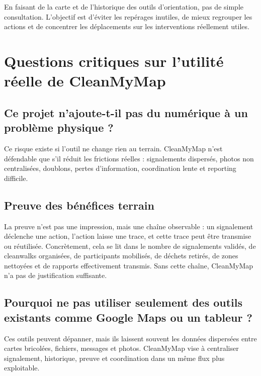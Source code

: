 \documentclass[
  10pt,
  a4paper,
  DIV=11,
  numbers=noendperiod,
  oneside]{scrreprt}
\begin{document}
En faisant de la carte et de l'historique des outils d'orientation, pas
de simple consultation. L'objectif est d'éviter les repérages inutiles,
de mieux regrouper les actions et de concentrer les déplacements sur les
interventions réellement utiles.

\section{Questions critiques sur l'utilité réelle de
CleanMyMap}\label{questions-critiques-sur-lutilituxe9-ruxe9elle-de-cleanmymap}

\subsection{Ce projet n'ajoute-t-il pas du numérique à un problème
physique
?}\label{ce-projet-najoute-t-il-pas-du-numuxe9rique-uxe0-un-probluxe8me-physique}

Ce risque existe si l'outil ne change rien au terrain. CleanMyMap n'est
défendable que s'il réduit les frictions réelles : signalements
dispersés, photos non centralisées, doublons, pertes d'information,
coordination lente et reporting difficile.

\subsection{Preuve des bénéfices
terrain}\label{preuve-des-buxe9nuxe9fices-terrain}

La preuve n'est pas une impression, mais une chaîne observable : un
signalement déclenche une action, l'action laisse une trace, et cette
trace peut être transmise ou réutilisée. Concrètement, cela se lit dans
le nombre de signalements validés, de cleanwalks organisées, de
participants mobilisés, de déchets retirés, de zones nettoyées et de
rapports effectivement transmis. Sans cette chaîne, CleanMyMap n'a pas
de justification suffisante.

\subsection{Pourquoi ne pas utiliser seulement des outils existants
comme Google Maps ou un tableur
?}\label{pourquoi-ne-pas-utiliser-seulement-des-outils-existants-comme-google-maps-ou-un-tableur}

Ces outils peuvent dépanner, mais ils laissent souvent les données
dispersées entre cartes bricolées, fichiers, messages et photos.
CleanMyMap vise à centraliser signalement, historique, preuve et
coordination dans un même flux plus exploitable.
\end{document}
